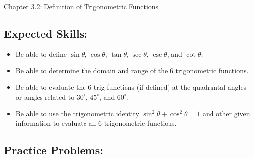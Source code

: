 \documentclass[12pt]{article}
\begin{document}
\begin{center}
\underline{\LARGE{Chapter 3.2: Definition of Trigonometric Functions}}
\end{center}

\subsection*{Expected Skills:}

\begin{itemize}

\item Be able to define $\sin{\theta}$, $\cos{\theta}$, $\tan{\theta}$, $\sec{\theta}$, $\csc{\theta}$, and $\cot{\theta}$.

\item Be able to determine the domain and range of the 6 trigonometric functions.

\item Be able to evaluate the 6 trig functions (if defined) at the quadrantal angles or angles related to $30^\circ$, $45^\circ$, and $60^\circ$.

\item Be able to use the trigonometric identity $\sin^2\theta+\cos^2\theta=1$ and other given information to evaluate all 6 trigonometric functions.

\end{itemize}

\subsection*{Practice Problems: }
\end{document}
